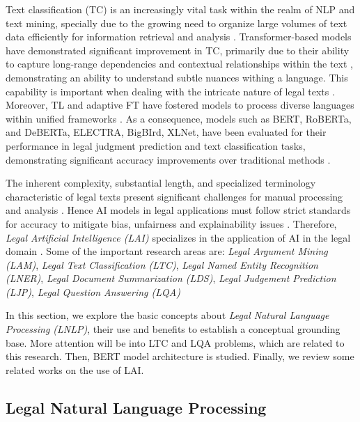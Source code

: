 \documentclass[onecolumn, journal, english, 12pt, a4paper]{IEEEtran} %
\theoremstyle{definition}
\begin{document}
Text classification (TC) is an increasingly vital task within the
realm of NLP and text mining, specially due to the growing need to
organize large volumes of text data efficiently for information
retrieval and analysis \cite{Allam2025}.  Transformer-based models
have demonstrated significant improvement in TC, primarily due to
their ability to capture long-range dependencies and contextual
relationships within the text
\cite{Allam2025}\cite{vaswani2017attention}, demonstrating an ability
to understand subtle nuances withing a language. This capability is
important when dealing with the intricate nature of legal texts
\cite{Ariai2024}. Moreover, TL and adaptive FT have fostered models to
process diverse languages within unified frameworks
\cite{Allam2025}. As a consequence, models such as BERT, RoBERTa, and
DeBERTa, ELECTRA, BigBIrd, XLNet, have been evaluated for their
performance in legal judgment prediction and text classification
tasks, demonstrating significant accuracy improvements over
traditional methods \cite{Gosh_Kumar_2024}.

The inherent complexity, substantial length, and specialized
terminology characteristic of legal texts present significant
challenges for manual processing and analysis
\cite{Ariai2024}.  Hence AI models in legal applications must follow
strict standards for accuracy to mitigate bias, unfairness and
explainability issues \cite{Ariai2024}. Therefore, \textit{Legal
  Artificial Intelligence (LAI)} specializes in the application of AI
in the legal domain \cite{Zhong2020}. Some of the important research
areas are: \textit{Legal Argument Mining (LAM)}, \textit{Legal Text
  Classification (LTC)}, \textit{Legal Named Entity Recognition
  (LNER)}, \textit{Legal Document Summarization (LDS)}, \textit{Legal
  Judgement Prediction (LJP)}, \textit{Legal Question Answering (LQA)}

In this section, we explore the basic concepts about \textit{Legal
  Natural Language Processing (LNLP)}, their use
and benefits to establish a conceptual grounding base. More attention
will be into LTC and LQA problems, which are related to this
research. Then, BERT model architecture is studied. Finally, we review
some related works on the use of LAI. 

\subsection{Legal Natural Language Processing}
\label{sec:legal-lang-proc}
\end{document}
